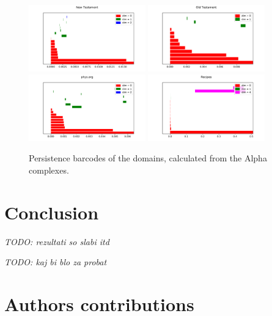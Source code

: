 \documentclass[12pt,a4paper]{amsart}
\begin{document}
\begin{figure}
  \centering
  \includegraphics[width=0.45\textwidth]{../plots/barcodes/bible-new}
  \includegraphics[width=0.45\textwidth]{../plots/barcodes/bible-old}
  \includegraphics[width=0.45\textwidth]{../plots/barcodes/phys}
  \includegraphics[width=0.45\textwidth]{../plots/barcodes/recipes}
  \caption{Persistence barcodes of the domains, calculated from the Alpha
    complexes.}
  \label{fig:barcode:alpha}
\end{figure}

\section{Conclusion}

\emph{TODO: rezultati so slabi itd}

\emph{TODO: kaj bi blo za probat}

\section{Authors contributions}



\end{document}
